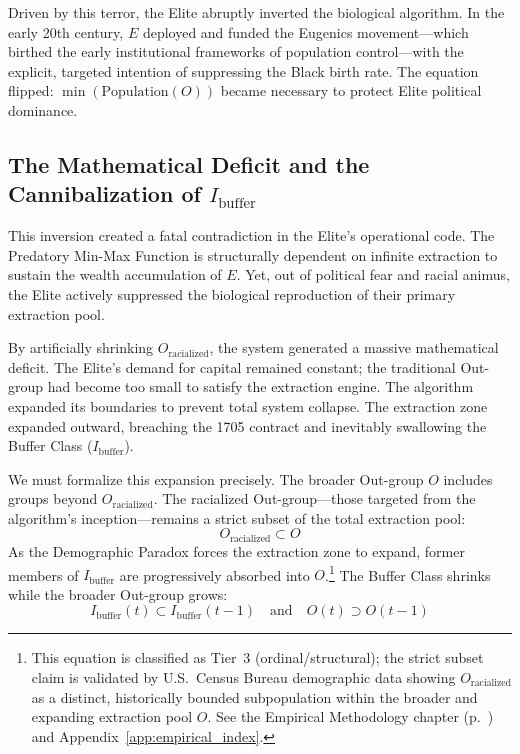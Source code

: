 Driven by this terror, the Elite abruptly inverted the biological algorithm. In the early 20th century, $E$ deployed and funded the Eugenics movement---which birthed the early institutional frameworks of population control---with the explicit, targeted intention of suppressing the Black birth rate. The equation flipped: $\min(\text{Population}(O))$ became necessary to protect Elite political dominance.

\subsection{The Mathematical Deficit and the Cannibalization of \texorpdfstring{$I_{\text{buffer}}$}{I\_buffer}}

This inversion created a fatal contradiction in the Elite's operational code. The Predatory Min-Max Function is structurally dependent on infinite extraction to sustain the wealth accumulation of $E$. Yet, out of political fear and racial animus, the Elite actively suppressed the biological reproduction of their primary extraction pool.

By artificially shrinking $O_{\text{racialized}}$, the system generated a massive mathematical deficit. The Elite's demand for capital remained constant; the traditional Out-group had become too small to satisfy the extraction engine. The algorithm expanded its boundaries to prevent total system collapse. The extraction zone expanded outward, breaching the 1705 contract and inevitably swallowing the Buffer Class ($I_{\text{buffer}}$).

We must formalize this expansion precisely. The broader Out-group $O$ includes groups beyond $O_{\text{racialized}}$. The racialized Out-group---those targeted from the algorithm's inception---remains a strict subset of the total extraction pool:
\begin{equation}\label{eq:10.1-outgroup-racialized-subset}
O_{\text{racialized}} \subset O
\end{equation}
As the Demographic Paradox forces the extraction zone to expand, former members of $I_{\text{buffer}}$ are progressively absorbed into $O$.\footnote{This equation is classified as Tier~3 (ordinal/structural); the strict subset claim is validated by U.S.\ Census Bureau demographic data showing $O_{\text{racialized}}$ as a distinct, historically bounded subpopulation within the broader and expanding extraction pool $O$. See the Empirical Methodology chapter (p.~\pageref{ch:empirical_methodology}) and Appendix~\ref{app:empirical_index}.} The Buffer Class shrinks while the broader Out-group grows:
\begin{equation}\label{eq:10.2-buffer-class-shrinkage}
I_{\text{buffer}}(t) \subset I_{\text{buffer}}(t-1) \quad \text{and} \quad O(t) \supset O(t-1)
\end{equation}

